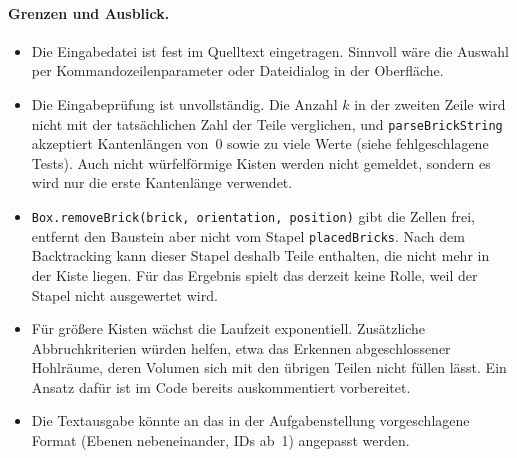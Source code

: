 \documentclass[11pt,a4paper,parskip=half]{scrartcl}
\newcommand{\code}[1]{\texttt{#1}}
\begin{document}
\paragraph{Grenzen und Ausblick.}
\begin{itemize}
  \item Die Eingabedatei ist fest im Quelltext eingetragen. Sinnvoll wäre die Auswahl
        per Kommandozeilenparameter oder Dateidialog in der Oberfläche.
  \item Die Eingabeprüfung ist unvollständig. Die Anzahl $k$ in der zweiten Zeile
        wird nicht mit der tatsächlichen Zahl der Teile verglichen, und
        \code{parseBrickString} akzeptiert Kantenlängen von~0 sowie zu viele Werte
        (siehe fehlgeschlagene Tests). Auch nicht würfelförmige Kisten werden nicht
        gemeldet, sondern es wird nur die erste Kantenlänge verwendet.
  \item \code{Box.removeBrick(brick, orientation, position)} gibt die Zellen frei,
        entfernt den Baustein aber nicht vom Stapel \code{placedBricks}. Nach dem
        Backtracking kann dieser Stapel deshalb Teile enthalten, die nicht mehr in
        der Kiste liegen. Für das Ergebnis spielt das derzeit keine Rolle, weil der
        Stapel nicht ausgewertet wird.
  \item Für größere Kisten wächst die Laufzeit exponentiell. Zusätzliche
        Abbruchkriterien würden helfen, etwa das Erkennen abgeschlossener
        Hohlräume, deren Volumen sich mit den übrigen Teilen nicht füllen lässt. Ein
        Ansatz dafür ist im Code bereits auskommentiert vorbereitet.
  \item Die Textausgabe könnte an das in der Aufgabenstellung vorgeschlagene Format
        (Ebenen nebeneinander, IDs ab~1) angepasst werden.
\end{itemize}
\end{document}
